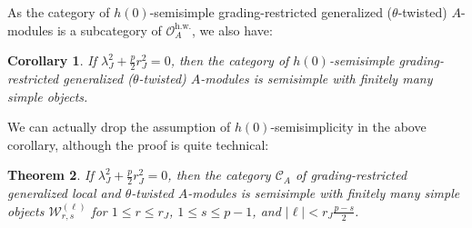 \documentclass[11pt, reqno]{amsart}
\newtheorem{thm}{Theorem}[section]
\newtheorem{cor}[thm]{Corollary}
\theoremstyle{definition}\newtheorem{defi}[thm]{Definition}
\theoremstyle{definition}\newtheorem{rem}[thm]{Remark}
\theoremstyle{definition}\newtheorem{exam}[thm]{Example}
\theoremstyle{definition}\newtheorem{assum}[thm]{Assumption}
\newcommand{\cO}{\mathcal{O}}
\newcommand{\cC}{\mathcal{C}}
\newcommand{\cW}{\mathcal{W}}
\begin{document}
As the category of $h(0)$-semisimple grading-restricted generalized ($\theta$-twisted) $A$-modules is a subcategory of $\cO_A^{\mathrm{h.w.}}$, we also have:
\begin{cor}\label{cor:h0_ss}
If $\lambda_J^2+\frac{p}{2}r_J^2=0$, then the category of $h(0)$-semisimple grading-restricted generalized ($\theta$-twisted) $A$-modules is semisimple with finitely many simple objects.
\end{cor}


We can actually drop the assumption of $h(0)$-semisimplicity in the above corollary, although the proof is quite technical:
\begin{thm}\label{thm:grad_rest_ss}
If $\lambda_J^2+\frac{p}{2}r_J^2=0$, then the category $\cC_A$ of grading-restricted generalized local and $\theta$-twisted $A$-modules is semisimple with finitely many simple objects $\cW_{r,s}^{(\ell)}$ for $1\leq r\leq r_J$, $1\leq s\leq p-1$, and $\vert\ell\vert <r_J\frac{p-s}{2}$.
\end{thm}
\end{document}
